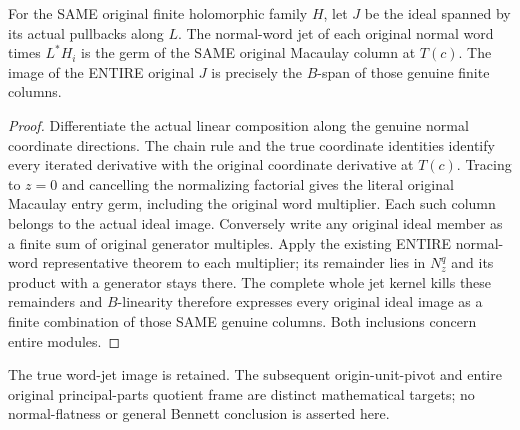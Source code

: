 \begin{theorem}
\label{hir:actual-centre-joint-whole-macaulay-image}
For the SAME original finite holomorphic family $H$, let $J$ be the
ideal spanned by its actual pullbacks along $L$. The normal-word jet
of each original normal word times $L^*H_i$ is the germ of the SAME
original Macaulay column at $T(c)$. The image of the ENTIRE original
$J$ is precisely the $B$-span of those genuine finite columns.
\leanok
\end{theorem}
\begin{proof}
Differentiate the actual linear composition along the genuine normal
coordinate directions. The chain rule and the true coordinate
identities identify every iterated derivative with the original
coordinate derivative at $T(c)$. Tracing to $z=0$ and cancelling the
normalizing factorial gives the literal original Macaulay entry germ,
including the original word multiplier. Each such column belongs to
the actual ideal image. Conversely write any original ideal member as
a finite sum of original generator multiples. Apply the existing
ENTIRE normal-word representative theorem to each multiplier; its
remainder lies in $N_z^q$ and its product with a generator stays there.
The complete whole jet kernel kills these remainders and $B$-linearity
therefore expresses every original ideal image as a finite combination
of those SAME genuine columns. Both inclusions concern entire modules.
\end{proof}

The true word-jet image is retained. The subsequent origin-unit-pivot
and entire original principal-parts quotient frame are distinct
mathematical targets; no normal-flatness or general Bennett conclusion
is asserted here.
